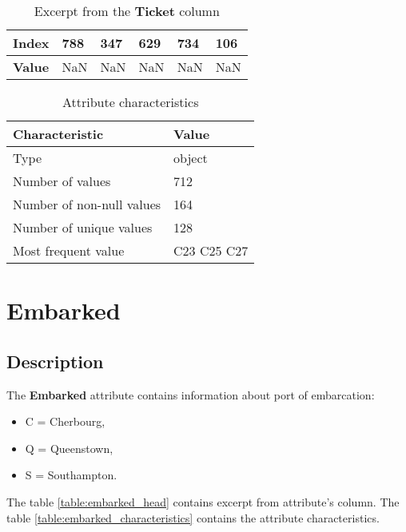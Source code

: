 \begin{table}[!hp]
    \centering
    \caption{Excerpt from the \textbf{Ticket} column}
    \begin{tabular}{|l|l|l|l|l|l|}
        \hline
        \textbf{Index} & 788 & 347 & 629 & 734 & 106 \\ \hline
        \textbf{Value} & NaN & NaN & NaN & NaN & NaN \\ \hline
    \end{tabular}
    \label{table:cabin_head}
\end{table}

\begin{table}[!hp]
    \centering
    \caption{Attribute characteristics}
    \begin{tabular}{|l|l|}
        \hline
        \textbf{Characteristic}   & \textbf{Value} \\ \hline
        Type                      & object         \\ \hline
        Number of values          & 712            \\ \hline
        Number of non-null values & 164            \\ \hline
        Number of unique values   & 128            \\ \hline
        Most frequent value       & C23 C25 C27    \\ \hline
    \end{tabular}
    \label{table:cabin_characteristics}
\end{table}


\section{Embarked} \label{section:Embarked}
\subsection{Description}
The \textbf{Embarked} attribute contains information about port of 
embarcation:
\begin{itemize}
    \item C = Cherbourg,
    \item Q = Queenstown,
    \item S = Southampton.
\end{itemize}

The table \ref{table:embarked_head} contains excerpt from attribute's column.
The table \ref{table:embarked_characteristics} contains the attribute 
characteristics.

